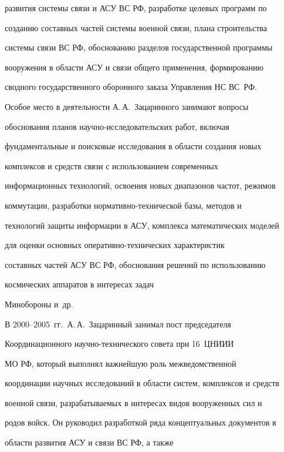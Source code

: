 развития сис\-те\-мы связи и АСУ ВС РФ, разработке целевых программ по 


созданию составных частей сис\-те\-мы военной связи, плана строительства 


сис\-те\-мы связи ВС РФ, обоснованию разделов государственной программы 


вооружения в области АСУ и связи общего применения, формированию 


сводного государственного оборонного заказа Управления НС ВС~РФ.


     


     Особое место в деятельности А.\,А.~Зацаринного занимают вопросы 


обоснования планов на\-уч\-но-ис\-сле\-до\-ва\-тель\-ских работ, включая 


фундаментальные и поисковые исследования в области создания новых 


комплексов и средств связи с использованием современных 


информационных технологий, освоения новых диапазонов частот, режимов 


коммутации, разработки нор\-ма\-тив\-но-тех\-ни\-че\-ской базы, методов и 


технологий защиты информации в АСУ, комплекса математических моделей 


для оценки основных опе\-ра\-тив\-но-тех\-ни\-че\-ских характеристик 


составных частей АСУ ВС РФ, обоснования решений по использованию 


космических аппаратов  в интересах задач 


Минобороны и~др.





В 2000--2005~гг.\ А.\,А.~Зацаринный занимал пост председателя 


Координационного на\-уч\-но-тех\-ни\-че\-ско\-го совета при 16~ЦНИИИ 


МО РФ, который выполнял важнейшую роль межведомственной 


координации научных исследований в об\-ласти сис\-тем, комплексов и средств 


военной связи, разрабатываемых в интересах видов вооруженных сил и 


родов войск. Он руководил разработкой ряда концептуальных документов в 


области развития АСУ и связи ВС РФ, а также 


